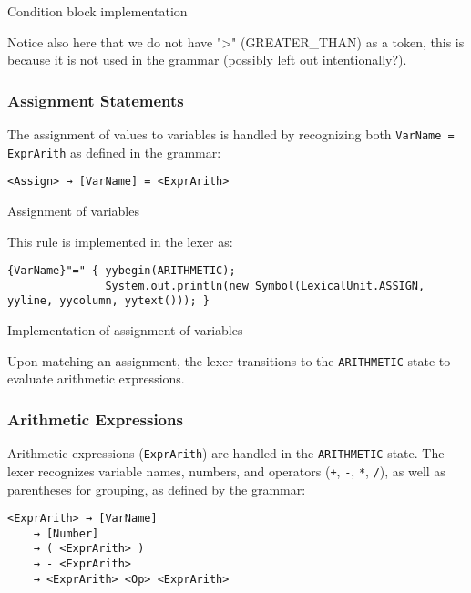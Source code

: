     \begin{table}[h]
		\centering
		\caption{Condition block implementation}
	\end{table}
 
	Notice also here that we do not have ">" (GREATER\_THAN) as a token, this is because it is not used in the grammar (possibly left out intentionally?).\\

	\subsubsection{Assignment Statements}
	The assignment of values to variables is handled by recognizing both \texttt{VarName = ExprArith} as defined in the grammar:

	\begin{verbatim}
<Assign> → [VarName] = <ExprArith>
	\end{verbatim}

    \begin{table}[h]
		\centering
		\caption{Assignment of variables}
	\end{table}

	This rule is implemented in the lexer as:

	\begin{verbatim}
{VarName}"=" { yybegin(ARITHMETIC);
               System.out.println(new Symbol(LexicalUnit.ASSIGN, yyline, yycolumn, yytext())); }
	\end{verbatim}

    \begin{table}[h]
		\centering
		\caption{Implementation of assignment of variables}
	\end{table}

	Upon matching an assignment, the lexer transitions to the \texttt{ARITHMETIC} state to evaluate arithmetic expressions.

	\subsubsection{Arithmetic Expressions}
	Arithmetic expressions (\texttt{ExprArith}) are handled in the \texttt{ARITHMETIC} state. The lexer recognizes variable names, numbers, and operators (\texttt{+}, \texttt{-}, \texttt{*}, \texttt{/}), as well as parentheses for grouping, as defined by the grammar:

	\begin{verbatim}
<ExprArith> → [VarName]
    → [Number]
    → ( <ExprArith> )
    → - <ExprArith>
    → <ExprArith> <Op> <ExprArith>
	\end{verbatim}


